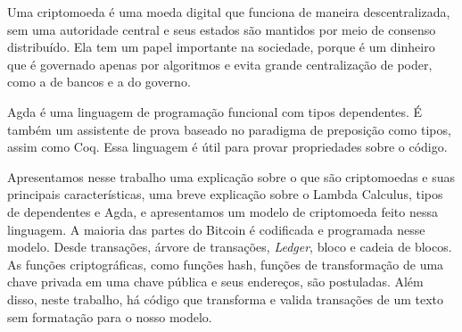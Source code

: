 \subtitle{Resumo}

Uma criptomoeda é uma moeda digital que funciona de maneira descentralizada, sem uma
autoridade central e seus estados são mantidos por meio de consenso distribuído.
Ela tem um papel importante na sociedade, porque é um dinheiro que é governado apenas por algoritmos
e evita grande centralização de poder, como a de bancos e a do governo.

Agda é uma linguagem de programação funcional com tipos dependentes.
É também um assistente de prova baseado no paradigma de preposição como tipos, assim como Coq.
Essa linguagem é útil para provar propriedades sobre o código.

Apresentamos nesse trabalho uma explicação sobre o que são criptomoedas e suas principais características,
uma breve explicação sobre o Lambda Calculus, tipos de dependentes e Agda,
e apresentamos um modelo de criptomoeda feito nessa linguagem.
A maioria das partes do Bitcoin é codificada e programada nesse modelo.
Desde transações, árvore de transações, \emph{Ledger}, bloco e cadeia de blocos.
As funções criptográficas, como funções hash,
funções de transformação de uma chave privada em uma chave pública e seus endereços,
são postuladas.
Além disso, neste trabalho, há código que transforma e valida transações
de um texto sem formatação para o nosso modelo.
